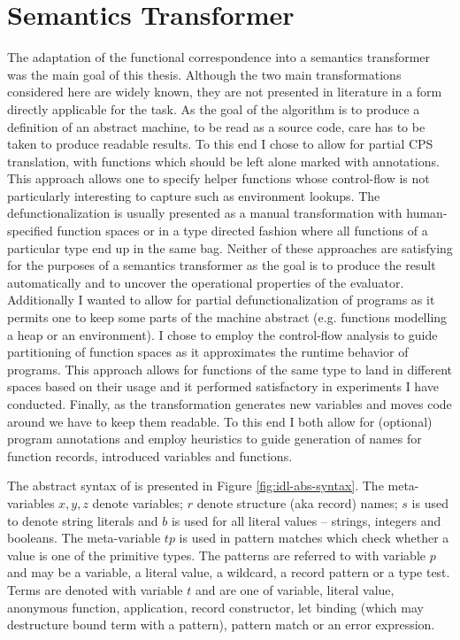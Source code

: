 \chapter{Semantics Transformer}\label{chapter:transformer}
The adaptation of the functional correspondence into a semantics transformer was the main goal of this thesis.
Although the two main transformations considered here are widely known, they are not presented in literature in a form directly applicable for the task.
As the goal of the algorithm is to produce a definition of an abstract machine, to be read as a source code, care has to be taken to produce readable results.
To this end I chose to allow for partial CPS translation, with functions which should be left alone marked with annotations.
This approach allows one to specify helper functions whose control-flow is not particularly interesting to capture such as environment lookups.
The defunctionalization is usually presented as a manual transformation with human-specified function spaces or in a type directed fashion where all functions of a particular type end up in the same bag.
Neither of these approaches are satisfying for the purposes of a semantics transformer as the goal is to produce the result automatically and to uncover the operational properties of the evaluator.
Additionally I wanted to allow for partial defunctionalization of programs as it permits one to keep some parts of the machine abstract (e.g. functions modelling a heap or an environment).
I chose to employ the control-flow analysis to guide partitioning of function spaces as it approximates the runtime behavior of programs.
This approach allows for functions of the same type to land in different spaces based on their usage and it performed satisfactory in experiments I have conducted.
Finally, as the transformation generates new variables and moves code around we have to keep them readable.
To this end I both allow for (optional) program annotations and employ heuristics to guide generation of names for function records, introduced variables and functions.

The abstract syntax of \IDL{} is presented in Figure \ref{fig:idl-abs-syntax}.
The meta-variables $x, y, z$ denote variables; $r$ denote structure (aka record) names; $s$ is used to denote string literals and $b$ is used for all literal values -- strings, integers and booleans.
The meta-variable $\mathit{tp}$ is used in pattern matches which check whether a value is one of the primitive types.
The patterns are referred to with variable $p$ and may be a variable, a literal value, a wildcard, a record pattern or a type test.
Terms are denoted with variable $t$ and are one of variable, literal value, anonymous function, application, record constructor, let binding (which may destructure bound term with a pattern), pattern match or an error expression.

